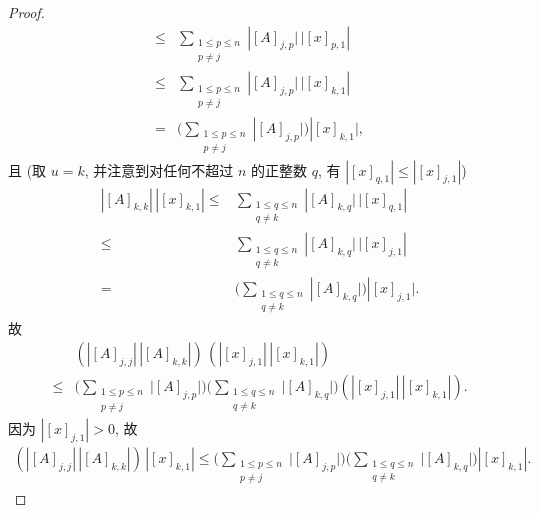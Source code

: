\begin{proof}
\begin{align*}
        \leq {} &
        \sum_{\substack{1 \leq p \leq n \\ p \neq j}}
        {|{[A]_{j,p}|\, |[x]_{p,1}}|}
        \\
        \leq {} &
        \sum_{\substack{1 \leq p \leq n \\ p \neq j}}
        {|{[A]_{j,p}|\, |[x]_{k,1}}|}
        \\
        = {}    &
        \Bigg(
        \sum_{\substack{1 \leq p \leq n \\ p \neq j}}
        {|{[A]_{j,p}|}
        \Bigg)
        |[x]_{k,1}}|,
    \end{align*}
    且
    (取 \(u = k\),
    并注意到对任何不超过 \(n\) 的正整数 \(q\),
    有 \(|[x]_{q,1}| \leq |[x]_{j,1}|\))
    \begin{align*}
        |[A]_{k,k}|\, |[x]_{k,1}|
        \leq {} &
        \sum_{\substack{1 \leq q \leq n \\ q \neq k}}
        {|{[A]_{k,q}|\, |[x]_{q,1}}|}
        \\
        \leq {} &
        \sum_{\substack{1 \leq q \leq n \\ q \neq k}}
        {|{[A]_{k,q}|\, |[x]_{j,1}}|}
        \\
        = {}    &
        \Bigg(
        \sum_{\substack{1 \leq q \leq n \\ q \neq k}}
        {|{[A]_{k,q}|}
        \Bigg)
        |[x]_{j,1}}|.
    \end{align*}
    故
    \begin{align*}
                &
        (|[A]_{j,j}|\, |[A]_{k,k}|)\,
        (|[x]_{j,1}|\, |[x]_{k,1}|)
        \\
        \leq {} &
        \Bigg(
        \sum_{\substack{1 \leq p \leq n \\ p \neq j}}
        {|{[A]_{j,p}|}}
        \Bigg)
        \Bigg(
        \sum_{\substack{1 \leq q \leq n \\ q \neq k}}
        {|{[A]_{k,q}|}}
        \Bigg)
        (|[x]_{j,1}|\, |[x]_{k,1}|).
    \end{align*}
    因为 \(|[x]_{j,1}| > 0\),
    故
    \begin{align*}
        (|[A]_{j,j}|\, |[A]_{k,k}|)\,
        |[x]_{k,1}|
        \leq
        \Bigg(
        \sum_{\substack{1 \leq p \leq n \\ p \neq j}}
        {|{[A]_{j,p}|}}
        \Bigg)
        \Bigg(
        \sum_{\substack{1 \leq q \leq n \\ q \neq k}}
        {|{[A]_{k,q}|}}
        \Bigg)
        |[x]_{k,1}|.
    \end{align*}


\end{proof}
